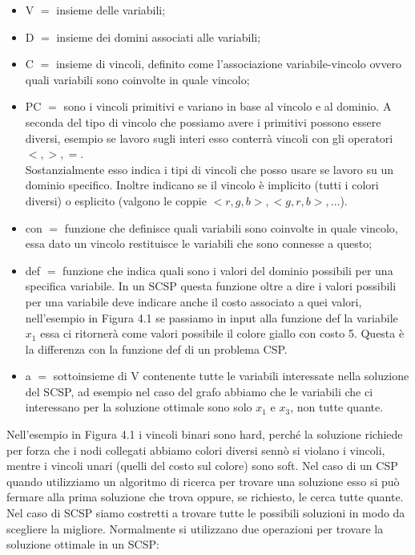 \begin{itemize}
    \item V $=$ insieme delle variabili;
    \item D $=$ insieme dei domini associati alle variabili;
    \item C $=$ insieme di vincoli, definito come l'associazione
          variabile-vincolo ovvero quali variabili sono coinvolte in quale vincolo;
    \item PC $=$ sono i vincoli primitivi e variano in base al vincolo e al
          dominio. A seconda del tipo di vincolo che possiamo avere i primitivi
          possono essere diversi, esempio se lavoro sugli interi esso conterrà
          vincoli con gli operatori $<,>,=$. \\Sostanzialmente esso indica i
          tipi di vincoli che posso usare se lavoro su un dominio specifico.
          Inoltre indicano se il vincolo è implicito (tutti i colori diversi) o
          esplicito (valgono le coppie $<r,g,b>, <g,r,b>, \ldots$).
    \item con $=$ funzione che definisce quali variabili sono coinvolte in quale
          vincolo, essa dato un vincolo restituisce le variabili che sono connesse a
          questo;
    \item def $=$ funzione che indica quali sono i valori del dominio possibili
          per una specifica variabile. In un SCSP questa funzione oltre a dire i
          valori possibili per una variabile deve indicare anche il costo associato a
          quei valori, nell'esempio in Figura 4.1 se passiamo in input alla funzione
          def la variabile $x_1$ essa ci ritornerà come valori possibile il colore giallo
          con costo 5. Questa è la differenza con la funzione def di un problema CSP.
    \item a $=$ sottoinsieme di V contenente tutte le variabili interessate
          nella soluzione del SCSP, ad esempio nel caso del grafo abbiamo che le
          variabili che ci interessano per la soluzione ottimale sono solo $x_1$ e
          $x_3$, non tutte quante.
\end{itemize}
Nell'esempio in Figura 4.1 i vincoli binari sono hard, perché la soluzione
richiede per forza che i nodi collegati abbiamo colori diversi sennò si violano
i vincoli, mentre i vincoli unari (quelli del costo sul colore) sono soft. Nel
caso di un CSP quando utilizziamo un algoritmo di ricerca per trovare una
soluzione esso si può fermare alla prima soluzione che trova oppure, se
richiesto, le cerca tutte quante. Nel caso di SCSP siamo costretti a trovare
tutte le possibili soluzioni in modo da scegliere la migliore. Normalmente si
utilizzano due operazioni per trovare la soluzione ottimale in un SCSP:

